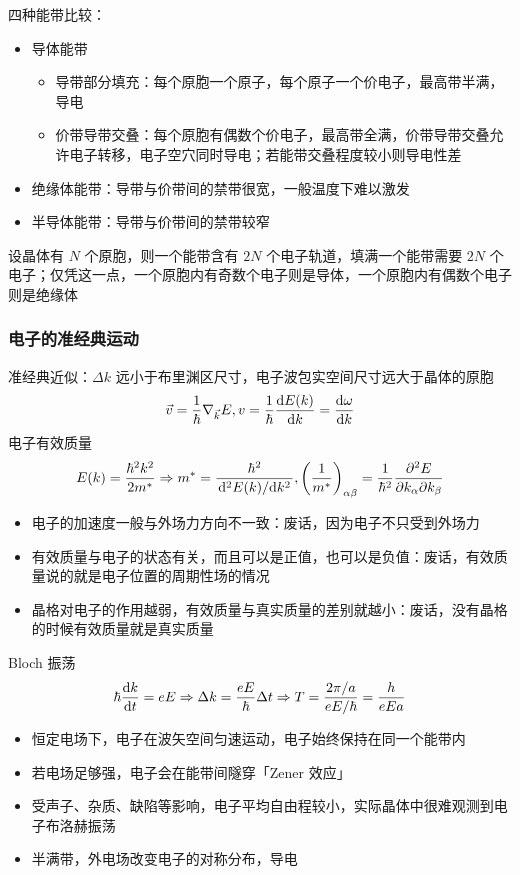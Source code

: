 \begin{framed}
    四种能带比较：
    \begin{itemize}
        \item 导体能带 \begin{itemize}
                  \item 导带部分填充：每个原胞一个原子，每个原子一个价电子，最高带半满，导电
                  \item 价带导带交叠：每个原胞有偶数个价电子，最高带全满，价带导带交叠允许电子转移，电子空穴同时导电；若能带交叠程度较小则导电性差
              \end{itemize}
        \item 绝缘体能带：导带与价带间的禁带很宽，一般温度下难以激发
        \item 半导体能带：导带与价带间的禁带较窄
    \end{itemize}
    设晶体有 $N$ 个原胞，则一个能带含有 $2 N$ 个电子轨道，填满一个能带需要 $2 N$ 个电子；仅凭这一点，一个原胞内有奇数个电子则是导体，一个原胞内有偶数个电子则是绝缘体
\end{framed}

\subsubsection{电子的准经典运动}

准经典近似：$\Delta k$ 远小于布里渊区尺寸，电子波包实空间尺寸远大于晶体的原胞
\[ \vec{v} = \frac{1}{\hbar} \nabla_{\vec{k}}E, v = \frac{1}{\hbar} \dv{E(k)}{k} = \dv{\omega}{k} \]
电子有效质量
\[ E(k) = \frac{\hbar^2 k^2}{2 m^*} \Rightarrow m^* = \frac{\hbar^2}{\dv*[2]{E(k)}{k}}, \qty(\frac{1}{m^*})_{\alpha\beta} = \frac{1}{\hbar^2}\pdv{E}{k_{\alpha}}{k_{\beta}} \]
\begin{framed}
    \begin{itemize}
        \item 电子的加速度一般与外场力方向不一致：废话，因为电子不只受到外场力
        \item 有效质量与电子的状态有关，而且可以是正值，也可以是负值：废话，有效质量说的就是电子位置的周期性场的情况
        \item 晶格对电子的作用越弱，有效质量与真实质量的差别就越小：废话，没有晶格的时候有效质量就是真实质量
    \end{itemize}
\end{framed}

Bloch 振荡
\[ \hbar \dv{k}{t} = e E \Rightarrow \Delta k = \frac{e E}{\hbar} \Delta t \Rightarrow T = \frac{2 \pi / a}{e E / \hbar} = \frac{h}{e E a} \]
\begin{itemize}
    \item 恒定电场下，电子在波矢空间匀速运动，电子始终保持在同一个能带内
    \item 若电场足够强，电子会在能带间隧穿「Zener 效应」
    \item 受声子、杂质、缺陷等影响，电子平均自由程较小，实际晶体中很难观测到电子布洛赫振荡
    \item 半满带，外电场改变电子的对称分布，导电
\end{itemize}

